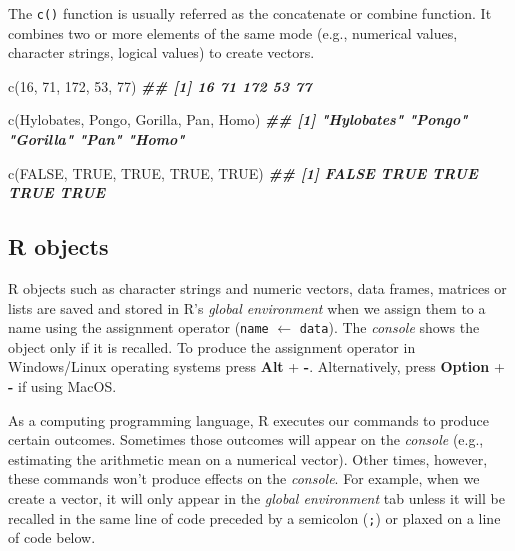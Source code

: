 \documentclass[
]{book}
\newenvironment{Shaded}{\begin{snugshade}}{\end{snugshade}}
\newcommand{\ConstantTok}[1]{\textcolor[rgb]{0.00,0.00,0.00}{#1}}
\newcommand{\DecValTok}[1]{\textcolor[rgb]{0.00,0.00,0.81}{#1}}
\newcommand{\DocumentationTok}[1]{\textcolor[rgb]{0.56,0.35,0.01}{\textbf{\textit{#1}}}}
\newcommand{\FunctionTok}[1]{\textcolor[rgb]{0.00,0.00,0.00}{#1}}
\newcommand{\NormalTok}[1]{#1}
\newcommand{\StringTok}[1]{\textcolor[rgb]{0.31,0.60,0.02}{#1}}
\theoremstyle{definition}
\theoremstyle{definition}
\theoremstyle{definition}
\theoremstyle{definition}
\theoremstyle{remark}
\begin{document}
The \texttt{c()} function is usually referred as the concatenate or combine function. It combines two or more elements of the same mode (e.g., numerical values, character strings, logical values) to create vectors.

\begin{Shaded}
\begin{Highlighting}[]

\FunctionTok{c}\NormalTok{(}\DecValTok{16}\NormalTok{, }\DecValTok{71}\NormalTok{, }\DecValTok{172}\NormalTok{, }\DecValTok{53}\NormalTok{, }\DecValTok{77}\NormalTok{)}
\DocumentationTok{\#\# [1]  16  71 172  53  77}

\FunctionTok{c}\NormalTok{(}\StringTok{\textquotesingle{}Hylobates\textquotesingle{}}\NormalTok{, }\StringTok{\textquotesingle{}Pongo\textquotesingle{}}\NormalTok{, }\StringTok{\textquotesingle{}Gorilla\textquotesingle{}}\NormalTok{, }\StringTok{\textquotesingle{}Pan\textquotesingle{}}\NormalTok{, }\StringTok{\textquotesingle{}Homo\textquotesingle{}}\NormalTok{)}
\DocumentationTok{\#\# [1] "Hylobates" "Pongo"     "Gorilla"   "Pan"       "Homo"}

\FunctionTok{c}\NormalTok{(}\ConstantTok{FALSE}\NormalTok{, }\ConstantTok{TRUE}\NormalTok{, }\ConstantTok{TRUE}\NormalTok{, }\ConstantTok{TRUE}\NormalTok{, }\ConstantTok{TRUE}\NormalTok{)}
\DocumentationTok{\#\# [1] FALSE  TRUE  TRUE  TRUE  TRUE}
\end{Highlighting}
\end{Shaded}

\hypertarget{r-objects}{%
\subsection{R objects}\label{r-objects}}

R objects such as character strings and numeric vectors, data frames, matrices or lists are saved and stored in R's \emph{global environment} when we assign them to a name using the assignment operator (\texttt{name} \(\gets\) \texttt{data}). The \emph{console} shows the object only if it is recalled. To produce the assignment operator in Windows/Linux operating systems press \textbf{Alt} + \textbf{-}. Alternatively, press \textbf{Option} + \textbf{-} if using MacOS.

As a computing programming language, R executes our commands to produce certain outcomes. Sometimes those outcomes will appear on the \emph{console} (e.g., estimating the arithmetic mean on a numerical vector). Other times, however, these commands won't produce effects on the \emph{console}. For example, when we create a vector, it will only appear in the \emph{global environment} tab unless it will be recalled in the same line of code preceded by a semicolon (\texttt{;}) or plaxed on a line of code below.
\end{document}
